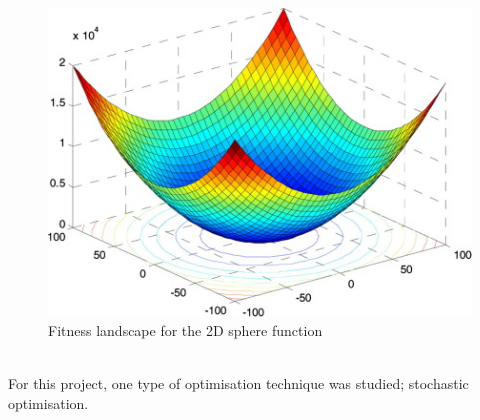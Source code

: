 \begin{figure}[tp]
   \begin{center}
     \includegraphics{Figures/sphere_function}
   \end{center}
   \caption{Fitness landscape for the 2D sphere function}
   \label{fig:fitness landscape}
\end{figure}
\\For this project, one type of optimisation technique was studied; stochastic optimisation. 

